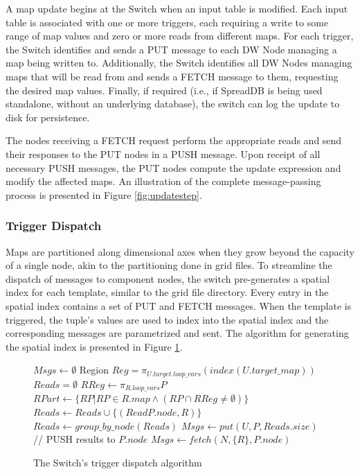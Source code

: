 \documentclass{sig-alternate}
\begin{document}
A map update begins at the Switch when an input table is modified.  Each input table is associated with one or more triggers, each requiring a write to some range of map values and zero or more reads from different maps.  For each trigger, the Switch identifies and sends a PUT message to each DW Node managing a map being written to.  Additionally, the Switch identifies all DW Nodes managing maps that will be read from and sends a FETCH message to them, requesting the desired map values.  Finally, if required (i.e., if SpreadDB is being used standalone, without an underlying database), the switch can log the update to disk for persistence.

The nodes receiving a FETCH request perform the appropriate reads and send their responses to the PUT nodes in a PUSH message.  Upon receipt of all necessary PUSH messages, the PUT nodes compute the update expression and modify the affected maps.  An illustration of the complete message-passing process is presented in Figure \ref{fig:updatestep}.  

\subsubsection{Trigger Dispatch}
Maps are partitioned along dimensional axes when they grow beyond the capacity of a single node, akin to the partitioning done in grid files\cite{318586}.  To streamline the dispatch of messages to component nodes, the switch pre-generates a spatial index for each template, similar to the grid file directory.  Every entry in the spatial index contains a set of PUT and FETCH messages.  When the template is triggered, the tuple's values are used to index into the spatial index and the corresponding messages are parametrized and sent.  The algorithm for generating the spatial index is presented in Figure \ref{alg:dispatch}.

\begin{figure}
\begin{algorithmic}[1]
\STATE $Msgs \leftarrow \emptyset$
	\STATE Region $Reg = \pi_{U.target.loop\_vars} \left(index(U.target\_map)\right)$
		\STATE $Reads = \emptyset$
			\STATE $RReg \leftarrow \pi_{R.loop\_vars} P$
			\STATE $RPart \leftarrow \{RP | RP\in R.map \wedge (RP \cap RReg \neq \emptyset)\}$
			\STATE $Reads \leftarrow Reads \cup \{(ReadP.node, R)\}$
		\ENDFOR
		\STATE $Reads \leftarrow group\_by\_node(Reads)$
		\STATE $Msgs \leftarrow put(U, P, Reads.size)$
		  \STATE // PUSH results to $P.node$
			\STATE $Msgs \leftarrow fetch(N, \{R\}, P.node)$
		\ENDFOR
	\ENDFOR
\ENDFOR
\end{algorithmic}
\caption{The Switch's trigger dispatch algorithm}
\label{alg:dispatch}
\end{figure}
\end{document}
